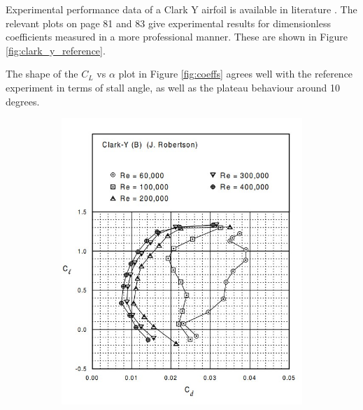 \documentclass[runningheads]{llncs}
\begin{document}
\noindent
Experimental performance data of a Clark Y airfoil is available in literature
\cite{lyon_broeren_giguere_gopalarathnam_selig_1997}. The relevant plots on page 81 and 83 give experimental results for dimensionless coefficients measured in a more professional manner. These are shown in Figure \ref{fig:clark_y_reference}.\newline

\noindent
The shape of the $C_L$ vs $\alpha$ plot in Figure \ref{fig:coeffs} agrees well with the reference experiment in terms of stall angle, as well as the plateau behaviour around 10 degrees.

\begin{figure}[h]
    \centering
    \begin{subfigure}[b]{0.45\textwidth}
         \centering
         \includegraphics[width=\textwidth]{figures/clark_y_reference_cl_cd.jpg}
         \caption{}
         \label{fig:reference_cl_cd}
     \end{subfigure}
     \begin{subfigure}[b]{0.45\textwidth}
         \centering

\end{subfigure}
\end{figure}
\end{document}
